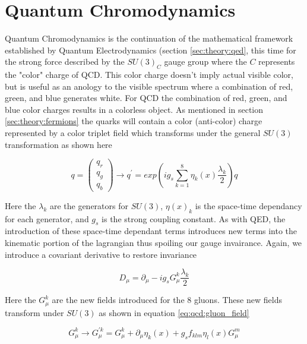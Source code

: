 \section{Quantum Chromodynamics} \label{sec:theory:qcd}

Quantum Chromodynamics is the continuation of the mathematical framework
established by Quantum Electrodynamics (section \ref{sec:theory:qed}, this time
for the strong force described by the $SU(3)_C$ gauge group where the $C$
represents the "color" charge of QCD.  This color charge doesn't imply actual
visible color, but is useful as an anology to the visible spectrum where a
combination of red, green, and blue generates white.  For QCD the combination of
red, green, and blue color charges results in a colorless object.  As mentioned
in section \ref{sec:theory:fermions} the quarks will contain a color
(anti-color) charge represented by a color triplet field which transforms under
the general $SU(3)$ transformation as shown here

\begin{equation}
q = \left( \begin{matrix} q_{r} \\ q_{g} \\ q_{b} \end{matrix} \right)
\rightarrow q^{'} = exp \left( ig_{s} \sum_{k=1}^{8} \eta_{k}(x)
\frac{\lambda_k}{2} \right) q
\end{equation}

Here the $\lambda_{k}$ are the generators for $SU(3)$, $\eta(x)_{k}$ is the
space-time dependancy for each generator, and  $g_s$ is the strong coupling constant.
As with QED, the introduction of these space-time dependant terms introduces new
terms into the kinematic portion of the lagrangian thus spoiling our gauge
invairance.  Again, we introduce a covariant derivative to restore invariance

\begin{equation}
D_{\mu} = \partial_{\mu} - ig_{s}G_{\mu}^{k}\frac{\lambda_{k}}{2}
\end{equation}

Here the $G_{\mu}^{k}$ are the new fields introduced for the 8 gluons.  These
new fields transform under $SU(3)$ as shown in equation
\ref{eq:qcd:gluon_field}

\begin{equation}
G_{\mu}^{k} \rightarrow G_{\mu}^{'k} = G_{\mu}^{k} + \partial_{\mu}\eta_{k}(x) +
g_{s}f_{klm}\eta_{l}(x)G_{\mu}^{m}
\end{equation}

